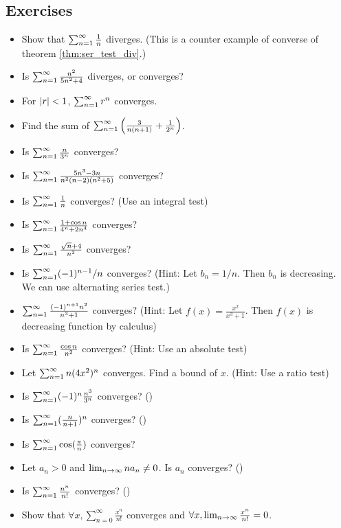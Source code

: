 \subsection{Exercises}
\begin{itemize}
  \item Show that $\sum_{n=1}^{\infty} \frac{1}{n}$ diverges. (This is a counter example of converse of theorem \ref{thm:ser_test_div}.)
  \item Is $\sum_{n=1}^{\infty} \frac{n^2}{5n^2 + 4}$ diverges, or converges?
  \item For $\left| r \right| < 1$, $\sum_{n=1}^{\infty} r^n$ converges.
  \item Find the sum of $\sum_{n=1}^{\infty} \left( \frac{3}{n(n+1)} + \frac{1}{2^n} \right)$.
  \item Is $\sum_{n=1}^{\infty} \frac{n}{3^n}$ converges?
  \item Is $\sum_{n=1}^{\infty} \frac{5n^3-3n}{n^2(n-2)(n^2+5)}$ converges?
  \item Is $\sum_{n=1}^{\infty} \frac{1}{n}$ converges? (Use an integral test)
  \item Is $\sum_{n=1}^{\infty} \frac{1 + \cos n}{4^n+2n^4}$ converges?
  \item Is $\sum_{n=1}^{\infty} \frac{\sqrt{n}+4}{n^2}$ converges?
  \item Is $\sum_{n=1}^{\infty} (-1)^{n-1}/n$ converges? (Hint: Let $b_n = 1/n$. Then $b_n$ is
        decreasing. We can use alternating series test.)
  \item $\sum_{n=1}^{\infty} \frac{(-1)^{n+1}n^2}{n^3+1}$ converges? (Hint: Let $f(x) =
          \frac{x^2}{x^3+1}$. Then $f(x)$ is decreasing function by calculus)
  \item Is $\sum_{n=1}^{\infty} \frac{\cos n}{n^2}$ converges? (Hint: Use an absolute test)
  \item Let $\sum_{n=1}^{\infty} n(4x^2)^n$ converges. Find a bound of $x$. (Hint: Use a ratio test)
  \item Is $\sum_{n=1}^{\infty} (-1)^n \frac{n^3}{3^n}$ converges? ()
  \item Is $\sum_{n=1}^{\infty} (\frac{n}{n+1})^n$ converges? ()
  \item Is $\sum_{n=1}^{\infty} \cos(\frac{\pi}{n})$ converges?
  \item Let $a_n > 0$ and $\lim_{n \to \infty} n a_n \neq 0$. Is $a_n$ converges? ()
  \item Is $\sum_{n=1}^{\infty} \frac{n^n}{n!}$ converges? ()
  \item Show that $\forall x, \sum_{n=0}^{\infty} \frac{x^n}{n!}$ converges and
        $\forall x, \lim_{n \to \infty} \frac{x^n}{n!} = 0$.
\end{itemize}

